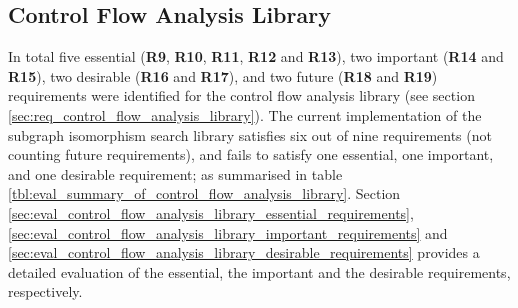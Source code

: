 
\subsection{Control Flow Analysis Library}
\label{sec:eval_control_flow_analysis_library}

In total five essential (\textbf{R9}, \textbf{R10}, \textbf{R11}, \textbf{R12} and \textbf{R13}), two important (\textbf{R14} and \textbf{R15}), two desirable (\textbf{R16} and \textbf{R17}), and two future (\textbf{R18} and \textbf{R19}) requirements were identified for the control flow analysis library (see section \ref{sec:req_control_flow_analysis_library}). The current implementation of the subgraph isomorphism search library satisfies six out of nine requirements (not counting future requirements), and fails to satisfy one essential, one important, and one desirable requirement; as summarised in table \ref{tbl:eval_summary_of_control_flow_analysis_library}. Section \ref{sec:eval_control_flow_analysis_library_essential_requirements}, \ref{sec:eval_control_flow_analysis_library_important_requirements} and \ref{sec:eval_control_flow_analysis_library_desirable_requirements} provides a detailed evaluation of the essential, the important and the desirable requirements, respectively.

